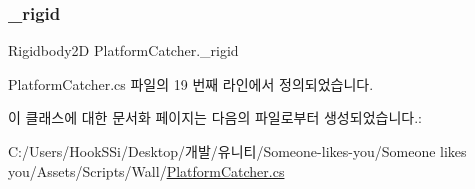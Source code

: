 \subsubsection{\texorpdfstring{\_rigid}{\_rigid}}
{\footnotesize\ttfamily Rigidbody2D Platform\+Catcher.\+\_\+rigid\hspace{0.3cm}{\ttfamily [private]}}



Platform\+Catcher.\+cs 파일의 19 번째 라인에서 정의되었습니다.



이 클래스에 대한 문서화 페이지는 다음의 파일로부터 생성되었습니다.\+:\begin{DoxyCompactItemize}
\item 
C\+:/\+Users/\+Hook\+S\+Si/\+Desktop/개발/유니티/\+Someone-\/likes-\/you/\+Someone likes you/\+Assets/\+Scripts/\+Wall/\mbox{\hyperlink{_platform_catcher_8cs}{Platform\+Catcher.\+cs}}\end{DoxyCompactItemize}
